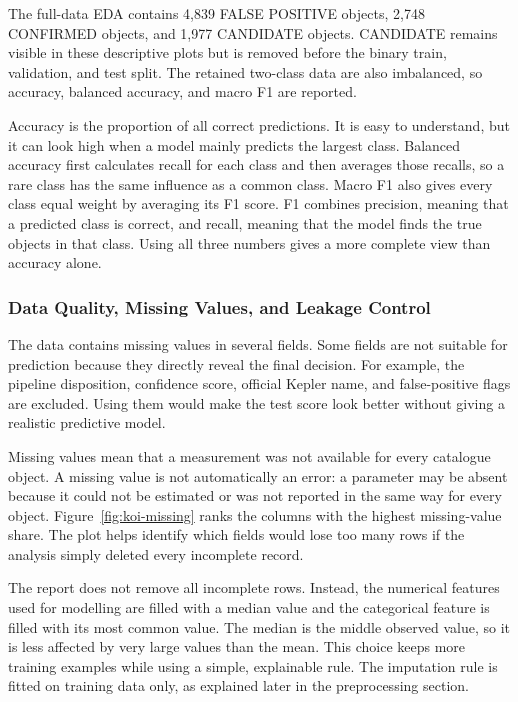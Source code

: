 \documentclass[oneside]{hcmut-report}
\begin{document}
The full-data EDA contains 4,839 FALSE POSITIVE objects, 2,748 CONFIRMED objects, and 1,977 CANDIDATE objects. CANDIDATE remains visible in these descriptive plots but is removed before the binary train, validation, and test split. The retained two-class data are also imbalanced, so accuracy, balanced accuracy, and macro F1 are reported.

Accuracy is the proportion of all correct predictions. It is easy to understand, but it can look high when a model mainly predicts the largest class. Balanced accuracy first calculates recall for each class and then averages those recalls, so a rare class has the same influence as a common class. Macro F1 also gives every class equal weight by averaging its F1 score. F1 combines precision, meaning that a predicted class is correct, and recall, meaning that the model finds the true objects in that class. Using all three numbers gives a more complete view than accuracy alone.

\subsubsection{Data Quality, Missing Values, and Leakage Control}

The data contains missing values in several fields. Some fields are not suitable for prediction because they directly reveal the final decision. For example, the pipeline disposition, confidence score, official Kepler name, and false-positive flags are excluded. Using them would make the test score look better without giving a realistic predictive model.

Missing values mean that a measurement was not available for every catalogue object. A missing value is not automatically an error: a parameter may be absent because it could not be estimated or was not reported in the same way for every object. Figure~\ref{fig:koi-missing} ranks the columns with the highest missing-value share. The plot helps identify which fields would lose too many rows if the analysis simply deleted every incomplete record.

The report does not remove all incomplete rows. Instead, the numerical features used for modelling are filled with a median value and the categorical feature is filled with its most common value. The median is the middle observed value, so it is less affected by very large values than the mean. This choice keeps more training examples while using a simple, explainable rule. The imputation rule is fitted on training data only, as explained later in the preprocessing section.
\end{document}
